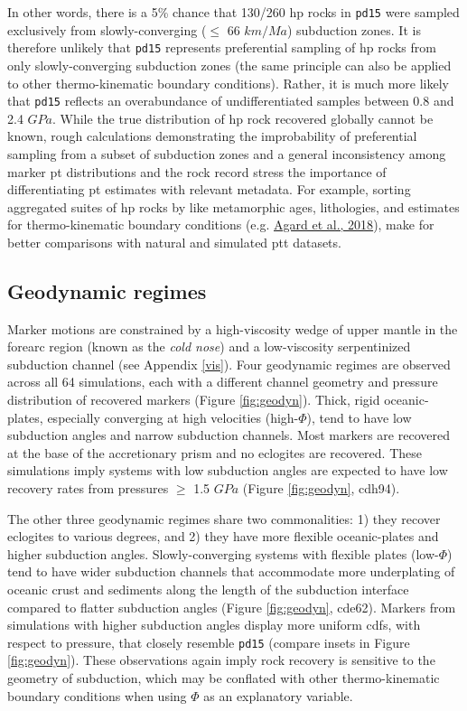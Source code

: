 In other words, there is a 5\% chance that 130/260 \gls{hp} rocks in \texttt{pd15} were sampled exclusively from slowly-converging (\(\leq\) 66 \(km/Ma\)) subduction zones. It is therefore unlikely that \texttt{pd15} represents preferential sampling of \gls{hp} rocks from only slowly-converging subduction zones (the same principle can also be applied to other thermo-kinematic boundary conditions). Rather, it is much more likely that \texttt{pd15} reflects an overabundance of undifferentiated samples between 0.8 and 2.4 \(GPa\). While the true distribution of \gls{hp} rock recovered globally cannot be known, rough calculations demonstrating the improbability of preferential sampling from a subset of subduction zones and a general inconsistency among marker \gls{pt} distributions and the rock record stress the importance of differentiating \gls{pt} estimates with relevant metadata. For example, sorting aggregated suites of \gls{hp} rocks by like metamorphic ages, lithologies, and estimates for thermo-kinematic boundary conditions (e.g. \protect\hyperlink{ref-agard2018}{Agard et al., 2018}), make for better comparisons with natural and simulated \gls{ptt} datasets.

\hypertarget{geodynamics}{%
\subsection{Geodynamic regimes}\label{geodynamics}}

Marker motions are constrained by a high-viscosity wedge of upper mantle in the forearc region (known as the \emph{cold nose}) and a low-viscosity serpentinized subduction channel (see Appendix \ref{vis}). Four geodynamic regimes are observed across all 64 simulations, each with a different channel geometry and pressure distribution of recovered markers (Figure \ref{fig:geodyn}). Thick, rigid oceanic-plates, especially converging at high velocities (high-\(\Phi\)), tend to have low subduction angles and narrow subduction channels. Most markers are recovered at the base of the accretionary prism and no eclogites are recovered. These simulations imply systems with low subduction angles are expected to have low recovery rates from pressures \(\geq\) 1.5 \(GPa\) (Figure \ref{fig:geodyn}, cdh94).

The other three geodynamic regimes share two commonalities: 1) they recover eclogites to various degrees, and 2) they have more flexible oceanic-plates and higher subduction angles. Slowly-converging systems with flexible plates (low-\(\Phi\)) tend to have wider subduction channels that accommodate more underplating of oceanic crust and sediments along the length of the subduction interface compared to flatter subduction angles (Figure \ref{fig:geodyn}, cde62). Markers from simulations with higher subduction angles display more uniform \glspl{cdf}, with respect to pressure, that closely resemble \texttt{pd15} (compare insets in Figure \ref{fig:geodyn}). These observations again imply rock recovery is sensitive to the geometry of subduction, which may be conflated with other thermo-kinematic boundary conditions when using \(\Phi\) as an explanatory variable.

